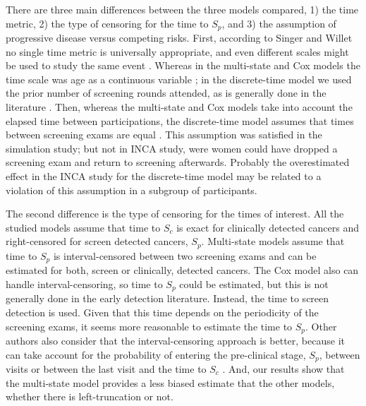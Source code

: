 \documentclass{bmcart}
\begin{document}
There are three main differences between the three models compared, 1) the time metric, 2) the type
of censoring for the time to $S_p$, and 3) the assumption of progressive disease versus competing
risks. First, according to Singer and Willet no single time metric is universally appropriate, and
even different scales might be used to study the same event \cite{Singer2003}. Whereas in the
multi-state and Cox models the time scale was age as a continuous variable \cite{Uhry2010,
Putter2006, Hofvind2006, Blanch2014}; in the discrete-time model we used the prior number of
screening rounds attended, as is generally done in the literature \cite{Blanch2013, Castells2013b,
Ripping2016}. Then, whereas the multi-state and Cox models take into account the elapsed time
between participations, the discrete-time model assumes that times between screening exams are
equal \cite{Singer2003}. This assumption was satisfied in the simulation study; but not in INCA
study, were women could have dropped a screening exam and return to screening afterwards. Probably
the overestimated effect in the INCA study for the discrete-time model may be related to a
violation of this assumption in a subgroup of participants. 

The second difference is the type of censoring for the times of interest. All the studied models
assume that time to $S_c$ is exact for clinically detected cancers and right-censored for screen
detected cancers, $S_p$. Multi-state models assume that time to $S_p$ is interval-censored between
two screening exams and can be estimated for both, screen or clinically, detected cancers. The Cox
model also can handle interval-censoring, so time to $S_p$ could be estimated, but this is not
generally done in the early detection literature. Instead, the time to screen detection is used.
Given that this time depends on the periodicity of the screening exams, it seems more reasonable to
estimate the time to $S_p$. Other authors also consider that the interval-censoring approach is
better, because it can take account for the probability of entering the pre-clinical stage, $S_p$,
between visits or between the last visit and the time to $S_c$ \cite{Leffondre2013}. And, our
results show that the multi-state model provides a less biased estimate that the other models,
whether there is left-truncation or not.  

%
\end{document}
